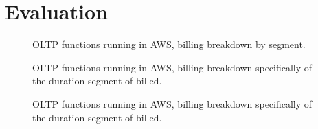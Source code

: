 \chapter{Evaluation}

\begin{figure}
    \begin{center}
        
    \end{center}
    \caption{OLTP \faaasc{} functions running in AWS, billing breakdown by segment.}
\end{figure}

\begin{figure}
    \begin{center}
        
    \end{center}
    \caption{OLTP \faaasc{} functions running in AWS, billing breakdown specifically of the duration segment of billed.}
\end{figure}

\begin{figure}
    \begin{center}
        
    \end{center}
    \caption{OLTP \faaasc{} functions running in AWS, billing breakdown specifically of the duration segment of billed.}
\end{figure}

